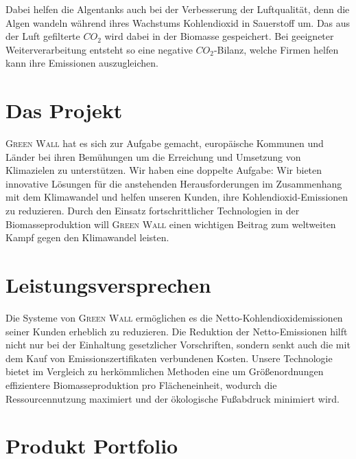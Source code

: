 Dabei helfen die Algentanks auch bei der Verbesserung der Luftqualität, denn die Algen wandeln während ihres Wachstums Kohlendioxid in Sauerstoff um.
Das aus der Luft gefilterte \(CO_2\) wird dabei in der Biomasse gespeichert.
Bei geeigneter Weiterverarbeitung entsteht so eine negative \(CO_2\)-Bilanz, welche Firmen helfen kann ihre Emissionen auszugleichen.

\section{Das Projekt}

\textsc{Green Wall} hat es sich zur Aufgabe gemacht, europäische Kommunen und Länder bei ihren Bemühungen um die Erreichung und Umsetzung von Klimazielen zu unterstützen.
Wir haben eine doppelte Aufgabe: Wir bieten innovative Lösungen für die anstehenden Herausforderungen im Zusammenhang mit dem Klimawandel und helfen unseren Kunden, ihre Kohlendioxid-Emissionen zu reduzieren.
Durch den Einsatz fortschrittlicher Technologien in der Biomasseproduktion will \textsc{Green Wall} einen wichtigen Beitrag zum weltweiten Kampf gegen den Klimawandel leisten.

\section{Leistungsversprechen}
Die Systeme von \textsc{Green Wall} ermöglichen es die Netto-Kohlendioxidemissionen seiner Kunden erheblich zu reduzieren.
Die Reduktion der Netto-Emissionen hilft nicht nur bei der Einhaltung gesetzlicher Vorschriften, sondern senkt auch die mit dem Kauf von Emissionszertifikaten verbundenen Kosten.
Unsere Technologie bietet im Vergleich zu herkömmlichen Methoden eine um Größenordnungen effizientere Biomasseproduktion pro Flächeneinheit, wodurch die Ressourcennutzung maximiert und der ökologische Fußabdruck minimiert wird.

\section{Produkt Portfolio}


